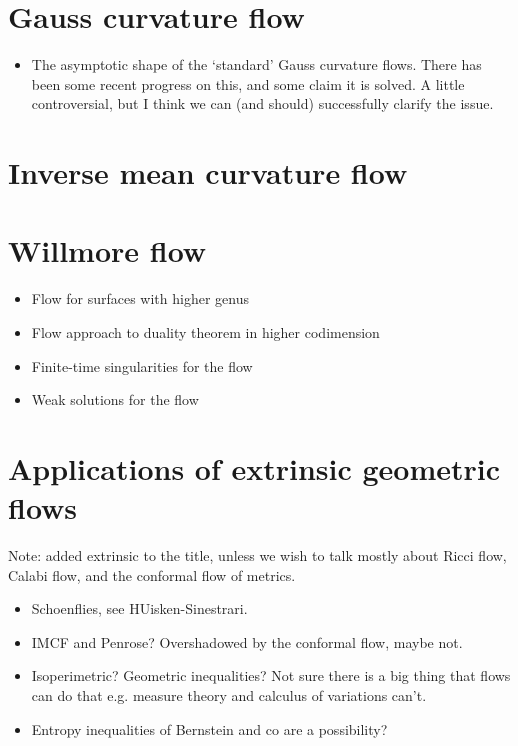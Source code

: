 \documentclass{amsart}
\theoremstyle{definition}
\begin{document}
\newpage

\section{Gauss curvature flow}

\begin{itemize}
\item The asymptotic shape of the `standard' Gauss curvature flows. There has been some recent progress on this, and some claim it is solved. A little controversial, but I think we can (and should) successfully clarify the issue.
\end{itemize}
  
\section{Inverse mean curvature flow}

\section{Willmore flow}

\begin{itemize}
\item Flow for surfaces with higher genus
\item Flow approach to duality theorem in higher codimension
\item Finite-time singularities for the flow
\item Weak solutions for the flow
\end{itemize}
 
\section{Applications of extrinsic geometric flows}

Note: added extrinsic to the title, unless we wish to talk mostly about Ricci flow, Calabi flow, and the conformal flow of metrics.

\begin{itemize}
\item Schoenflies, see HUisken-Sinestrari.
\item IMCF and Penrose? Overshadowed by the conformal flow, maybe not.
\item Isoperimetric? Geometric inequalities? Not sure there is a big thing that flows can do that e.g. measure theory and calculus of variations can't.
\item Entropy inequalities of Bernstein and co are a possibility?
\end{itemize}
\end{document}

